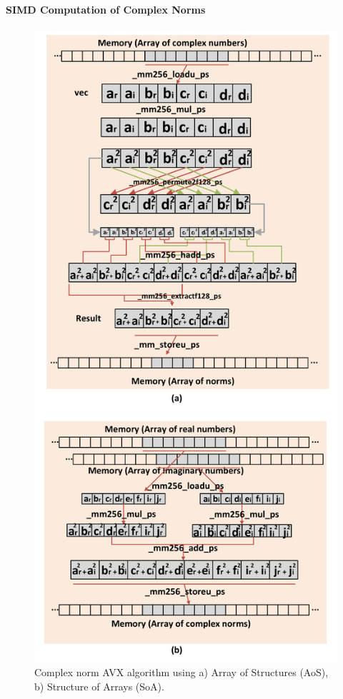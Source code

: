 \paragraph{SIMD Computation of Complex Norms}

\begin{figure}
  \centering
  \includegraphics[width=0.70\linewidth]{scma/simd_norm/simd_norm}
  \caption{Complex norm AVX algorithm using
           a) Array of Structures (AoS),
           b) Structure of Arrays (SoA).}
  \label{fig:scma_simd_norm}
\end{figure}

